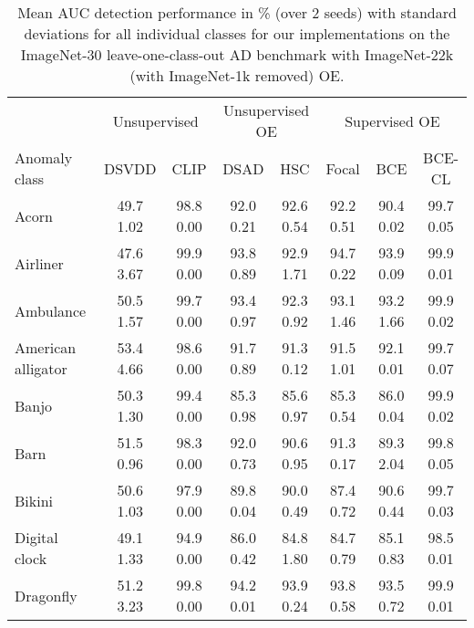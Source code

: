 \documentclass[10pt]{article} \usepackage[accepted]{stylefiles/tmlr}
\begin{document}
\begin{table*}[th]
    \caption{Mean AUC detection performance in \% (over 2 seeds) with standard deviations for all individual classes for our implementations on the ImageNet-30 leave-one-class-out AD benchmark with ImageNet-22k (with ImageNet-1k removed) OE. }
    \label{tab:appx_imagenet_loco}
    \vspace{0.5em}
    \centering\footnotesize
    
\begin{tabular}{lccccccc}
\toprule
& \multicolumn{2}{c|}{Unsupervised} & \multicolumn{2}{c|}{Unsupervised OE} & \multicolumn{3}{c}{Supervised OE} \\
Anomaly class & DSVDD & \multicolumn{1}{c|}{CLIP} & DSAD & \multicolumn{1}{c|}{HSC} & Focal & BCE & \multicolumn{1}{c}{BCE-CL} \\
\midrule
Acorn & 49.7  1.02 & \multicolumn{1}{c|}{98.8  0.00} & 92.0  0.21 & \multicolumn{1}{c|}{92.6  0.54} & 92.2  0.51 & 90.4  0.02 & \multicolumn{1}{c}{99.7  0.05} \\
Airliner & 47.6  3.67 & \multicolumn{1}{c|}{99.9  0.00} & 93.8  0.89 & \multicolumn{1}{c|}{92.9  1.71} & 94.7  0.22 & 93.9  0.09 & \multicolumn{1}{c}{99.9  0.01} \\
Ambulance & 50.5  1.57 & \multicolumn{1}{c|}{99.7  0.00} & 93.4  0.97 & \multicolumn{1}{c|}{92.3  0.92} & 93.1  1.46 & 93.2  1.66 & \multicolumn{1}{c}{99.9  0.02} \\
American alligator & 53.4  4.66 & \multicolumn{1}{c|}{98.6  0.00} & 91.7  0.89 & \multicolumn{1}{c|}{91.3  0.12} & 91.5  1.01 & 92.1  0.01 & \multicolumn{1}{c}{99.7  0.07} \\
Banjo & 50.3  1.30 & \multicolumn{1}{c|}{99.4  0.00} & 85.3  0.98 & \multicolumn{1}{c|}{85.6  0.97} & 85.3  0.54 & 86.0  0.04 & \multicolumn{1}{c}{99.9  0.02} \\
Barn & 51.5  0.96 & \multicolumn{1}{c|}{98.3  0.00} & 92.0  0.73 & \multicolumn{1}{c|}{90.6  0.95} & 91.3  0.17 & 89.3  2.04 & \multicolumn{1}{c}{99.8  0.05} \\
Bikini & 50.6  1.03 & \multicolumn{1}{c|}{97.9  0.00} & 89.8  0.04 & \multicolumn{1}{c|}{90.0  0.49} & 87.4  0.72 & 90.6  0.44 & \multicolumn{1}{c}{99.7  0.03} \\
Digital clock & 49.1  1.33 & \multicolumn{1}{c|}{94.9  0.00} & 86.0  0.42 & \multicolumn{1}{c|}{84.8  1.80} & 84.7  0.79 & 85.1  0.83 & \multicolumn{1}{c}{98.5  0.01} \\
Dragonfly & 51.2  3.23 & \multicolumn{1}{c|}{99.8  0.00} & 94.2  0.01 & \multicolumn{1}{c|}{93.9  0.24} & 93.8  0.58 & 93.5  0.72 & \multicolumn{1}{c}{99.9  0.01} \\

\end{tabular}
\end{table*}
\end{document}
